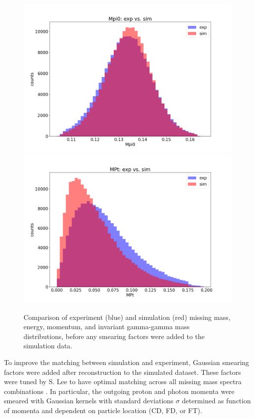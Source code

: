\begin{figure}[hbt]
	\includegraphics[page=133,width=0.3\linewidth]{Chapters/Ch4-BaseAnalysis/0_preprocessing/0_B_simulation_data_preprocessing/pics/nosmear/outbending_rad_All_All_All_no_smearingMpi0_exp_vs_sim.png}
	\includegraphics[page=135,width=0.3\linewidth]{Chapters/Ch4-BaseAnalysis/0_preprocessing/0_B_simulation_data_preprocessing/pics/nosmear/outbending_rad_All_All_All_no_smearingMPt_exp_vs_sim.png}
	
	\caption[Simulation and Experiment Matching before Smearing]{Comparison of experiment (blue) and simulation (red) missing mass, energy, momentum, and invariant gamma-gamma mass distributions, before any smearing factors were added to the simulation data.}
	\label{fig:bad}
\end{figure}


To improve the matching between simulation and experiment, Gaussian smearing factors were added after reconstruction to the simulated dataset. These factors were tuned by S. Lee \parencite{Lee2022MeasurementDetector} to have optimal matching across all missing mass spectra combinations . In particular, the outgoing proton and photon momenta were smeared with Gaussian kernels with standard deviations $\sigma$ determined as function of momenta and dependent on particle location (CD, FD, or FT).

